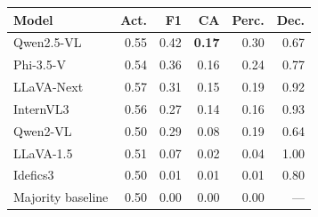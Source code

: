 \setlength{\tabcolsep}{2.7pt}
\begin{tabular}{lrrrrr}
\toprule
Model & Act. & F1 & \textbf{CA} & Perc. & Dec. \\
\midrule
Qwen2.5-VL & 0.55 & 0.42 & \textbf{0.17} & 0.30 & 0.67 \\
Phi-3.5-V & 0.54 & 0.36 & 0.16 & 0.24 & 0.77 \\
LLaVA-Next & 0.57 & 0.31 & 0.15 & 0.19 & 0.92 \\
InternVL3 & 0.56 & 0.27 & 0.14 & 0.16 & 0.93 \\
Qwen2-VL & 0.50 & 0.29 & 0.08 & 0.19 & 0.64 \\
LLaVA-1.5 & 0.51 & 0.07 & 0.02 & 0.04 & 1.00 \\
Idefics3 & 0.50 & 0.01 & 0.01 & 0.01 & 0.80 \\
\midrule
Majority baseline & 0.50 & 0.00 & 0.00 & 0.00 & --- \\
\bottomrule
\end{tabular}
